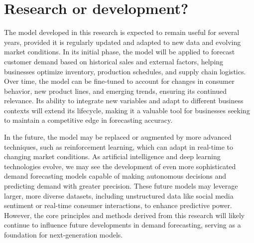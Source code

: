\documentclass[12pt]{article}
\begin{document}
\section{Research or development?}
The model developed in this research is expected to remain useful for several years, provided it is regularly updated and adapted to new data and evolving market conditions. In its initial phase, the model will be applied to forecast customer demand based on historical sales and external factors, helping businesses optimize inventory, production schedules, and supply chain logistics. Over time, the model can be fine-tuned to account for changes in consumer behavior, new product lines, and emerging trends, ensuring its continued relevance. Its ability to integrate new variables and adapt to different business contexts will extend its lifecycle, making it a valuable tool for businesses seeking to maintain a competitive edge in forecasting accuracy.

In the future, the model may be replaced or augmented by more advanced techniques, such as reinforcement learning, which can adapt in real-time to changing market conditions. As artificial intelligence and deep learning technologies evolve, we may see the development of even more sophisticated demand forecasting models capable of making autonomous decisions and predicting demand with greater precision. These future models may leverage larger, more diverse datasets, including unstructured data like social media sentiment or real-time consumer interactions, to enhance predictive power. However, the core principles and methods derived from this research will likely continue to influence future developments in demand forecasting, serving as a foundation for next-generation models.

%
%
\end{document}
